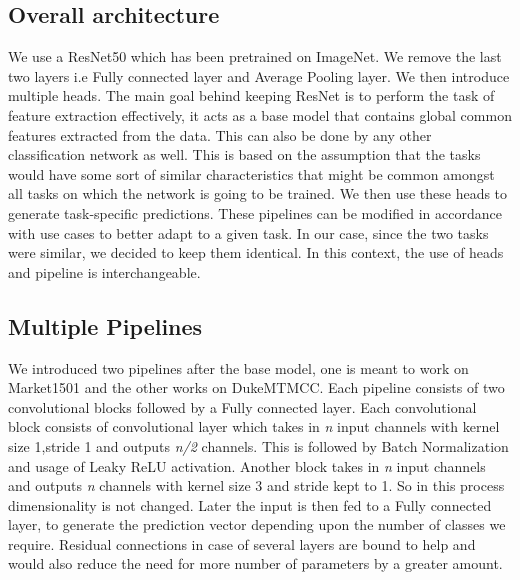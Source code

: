 \documentclass[10pt,twocolumn,letterpaper]{article}
\begin{document}
\subsection{Overall architecture}
We use a ResNet50\cite{DBLP:journals/corr/HeZRS15} which has been pretrained on ImageNet\cite{DBLP:journals/corr/RussakovskyDSKSMHKKBBF14}. We remove the last two layers i.e Fully connected layer and Average Pooling layer. We then introduce multiple heads. The main goal behind keeping ResNet is to perform the task of feature extraction effectively, it acts as a base model that contains global common features extracted from the data. This can also be done by any other classification network as well. This is based on the assumption that the tasks would have some sort of similar characteristics that might be common amongst all tasks on which the network is going to be trained. We then use these heads to generate task-specific predictions. These pipelines can be modified in accordance with use cases to better adapt to a given task. In our case, since the two tasks were similar, we decided to keep them identical. In this context, the use of heads and pipeline is interchangeable.


\subsection{Multiple Pipelines}
We introduced two pipelines after the base model, one is meant to work on Market1501\cite{zheng2015scalable} and the other works on DukeMTMCC\cite{DBLP:journals/corr/abs-1712-09531}. Each pipeline consists of two convolutional blocks followed by a Fully connected layer. Each convolutional block consists of convolutional layer which takes in \textit{n} input channels with kernel size 1,stride 1 and outputs \textit{n/2} channels. This is followed by Batch Normalization\cite{DBLP:journals/corr/IoffeS15} and usage of Leaky ReLU\cite{DBLP:journals/corr/abs-1803-08375} activation. Another block takes in \textit{n} input channels and outputs \textit{n} channels with kernel size 3 and stride kept to 1. So in this process dimensionality is not changed. Later the input is then fed to a Fully connected layer, to generate the prediction vector depending upon the number of classes we require. Residual connections in case of several layers are bound to help and would also reduce the need for more number of parameters by a greater amount.

\end{document}

